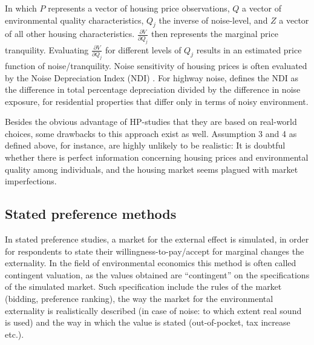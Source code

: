 \documentclass[a4paper]{scrartcl}
\begin{document}
In which $P$ represents a vector of housing price observations, $Q$ a vector of environmental quality characteristics, $Q_j$ the inverse of noise-level, and $Z$ a vector of all other housing characteristics. $\frac{\partial V}{\partial Q_j }$ then represents the marginal price tranquility. Evaluating  $\frac{\partial V}{\partial Q_j }$ for different levels of $Q_j$ results in an estimated price function of noise/tranquility. Noise sensitivity of housing prices is often evaluated by the Noise Depreciation Index (NDI) \citep{Walters1975}. For highway noise, \cite{Nelson1982} defines the NDI as the difference in total percentage depreciation divided by the difference in noise exposure, for residential properties that differ only in terms of noisy environment.	

Besides the obvious advantage of HP-studies that they are based on real-world choices, some drawbacks to this approach exist as well. Assumption 3 and 4 as defined above, for instance, are highly unlikely to be realistic: It is doubtful whether there is perfect information concerning housing prices and environmental quality among individuals, and the housing market seems plagued with market imperfections.


\subsection{Stated preference methods}

In stated preference studies, a market for the external effect is simulated, in order for respondents to state their willingness-to-pay/accept for marginal changes the externality. In the field of environmental economics this method is often called contingent valuation, as the values obtained are “contingent” on the specifications of the simulated market. Such specification include the rules of the market (bidding, preference ranking), the way the market for the environmental externality is realistically described (in case of noise: to which extent real sound is used) and the way in which the value is stated (out-of-pocket, tax increase etc.).



\end{document}

